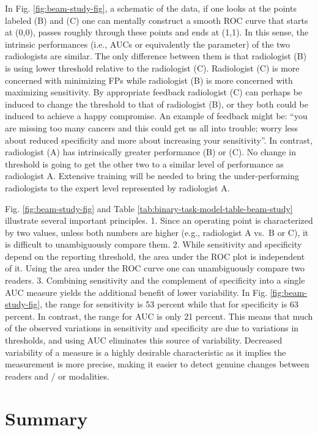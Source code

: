 \documentclass[
]{book}
\begin{document}
In Fig. \ref{fig:beam-study-fig}, a schematic of the data, if one looks at the points labeled (B) and (C) one can mentally construct a smooth ROC curve that starts at (0,0), passes roughly through these points and ends at (1,1). In this sense, the intrinsic performances (i.e., AUCs or equivalently the parameter) of the two radiologists are similar. The only difference between them is that radiologist (B) is using lower threshold relative to the radiologist (C). Radiologist (C) is more concerned with minimizing FPs while radiologist (B) is more concerned with maximizing sensitivity. By appropriate feedback radiologist (C) can perhaps be induced to change the threshold to that of radiologist (B), or they both could be induced to achieve a happy compromise. An example of feedback might be: ``you are missing too many cancers and this could get us all into trouble; worry less about reduced specificity and more about increasing your sensitivity''. In contrast, radiologist (A) has intrinsically greater performance (B) or (C). No change in threshold is going to get the other two to a similar level of performance as radiologist A. Extensive training will be needed to bring the under-performing radiologists to the expert level represented by radiologist A.

Fig. \ref{fig:beam-study-fig} and Table \ref{tab:binary-task-model-table-beam-study} illustrate several important principles.
1. Since an operating point is characterized by two values, unless both numbers are higher (e.g., radiologist A vs.~B or C), it is difficult to unambiguously compare them.
2. While sensitivity and specificity depend on the reporting threshold, the area under the ROC plot is independent of it. Using the area under the ROC curve one can unambiguously compare two readers.
3. Combining sensitivity and the complement of specificity into a single AUC measure yields the additional benefit of lower variability. In Fig. \ref{fig:beam-study-fig}, the range for sensitivity is 53 percent while that for specificity is 63 percent. In contrast, the range for AUC is only 21 percent. This means that much of the observed variations in sensitivity and specificity are due to variations in thresholds, and using AUC eliminates this source of variability. Decreased variability of a measure is a highly desirable characteristic as it implies the measurement is more precise, making it easier to detect genuine changes between readers and / or modalities.

\hypertarget{binary-task-model-summary}{%
\section{Summary}\label{binary-task-model-summary}}
\end{document}

